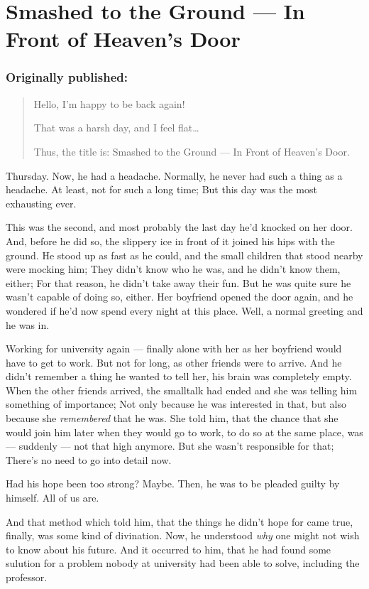 \chapter{Smashed to the Ground --- In Front of Heaven's Door}
\label{cha:smashed-ground-front-door}
\subsection*{Originally published: }
\begin{quote}
Hello, I'm happy to be back again!

That was a harsh day, and I feel flat\ldots

Thus, the title is: Smashed to the Ground --- In Front of Heaven's Door.
\end{quote}

Thursday. 
Now, he had a headache. 
Normally, he never had such a thing as a headache. 
At least, not for such a long time; But this day was the most exhausting ever.

This was the second, and most probably the last day he'd knocked on her door. 
And, before he did so, the slippery ice in front of it joined his hips with the ground. 
He stood up as fast as he could, and the small children that stood nearby were mocking him; They didn't know who he was, and he didn't know them, either; For that reason, he didn't take away their fun. 
But he was quite sure he wasn't capable of doing so, either. 
Her boyfriend opened the door again, and he wondered if he'd now spend every night at this place. 
Well, a normal greeting and he was in.

Working for university again --- finally alone with her as her boyfriend would have to get to work. 
But not for long, as other friends were to arrive. And he didn't remember a thing he wanted to tell her, his brain was completely empty. 
When the other friends arrived, the smalltalk had ended and she was telling him something of importance; Not only because he was interested in that, but also because she \emph{remembered} that he was. 
She told him, that the chance that she would join him later when they would go to work, to do so at the same place, was --- suddenly --- not that high anymore. 
But she wasn't responsible for that; There's no need to go into detail now.

Had his hope been too strong?
Maybe. 
Then, he was to be pleaded guilty by himself. 
All of us are.

And that method which told him, that the things he didn't hope for came true, finally, was some kind of divination. 
Now, he understood \emph{why} one might not wish to know about his future. 
And it occurred to him, that he had found some sulution for a problem nobody at university had been able to solve, including the professor.

